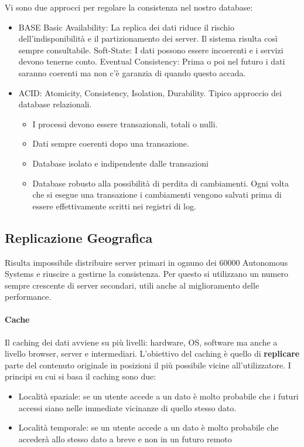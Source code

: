 \documentclass{article}
\begin{document}
		Vi sono due approcci per regolare la consistenza nel nostro database:
		\begin{itemize}
		    \item BASE
		    \subitem Basic Availability: La replica dei dati riduce il rischio dell'indisponibilità e il partizionamento dei server. Il sistema risulta così sempre consultabile. 
		    \subitem Soft-State: I dati possono essere incoerenti e i servizi devono tenerne conto. 
		    \subitem Eventual Consistency: Prima o poi nel futuro i dati saranno coerenti ma non c'è garanzia di quando questo accada.
		    \item ACID: Atomicity, Consistency, Isolation, Durability. Tipico approccio dei database relazionali.
			\begin{itemize}
				\item I processi devono essere transazionali, totali o nulli.
				\item Dati sempre coerenti dopo una transazione.
				\item Database isolato e indipendente dalle transazioni
				\item Database robusto alla possibilità di perdita di cambiamenti. Ogni volta che si esegue una transazione i cambiamenti vengono salvati prima di essere effettivamente scritti nei registri di log.
			\end{itemize}
		\end{itemize}
		
		\subsection{Replicazione Geografica}
		Risulta impossibile distribuire server primari in ognuno dei 60000 Autonomous Systems e riuscire a gestirne la consistenza. Per questo si utilizzano un numero sempre crescente di server secondari, utili anche al miglioramento delle performance.
		
		\paragraph{Cache}
		Il caching dei dati avviene su più livelli: hardware, OS, software ma anche a livello browser, server e intermediari. L'obiettivo del caching è quello di \textbf{replicare} parte del contenuto originale in posizioni il più possibile vicine all'utilizzatore.
		I principi su cui si basa il caching sono due:
		\begin{itemize}
			\item Località spaziale: se un utente accede a un dato è molto probabile che i futuri accessi siano nelle immediate vicinanze di quello stesso dato.
			\item Località temporale: se un utente accede a un dato è molto probabile che accederà allo stesso dato a breve e non in un futuro remoto
		\end{itemize}
		
\end{document}
